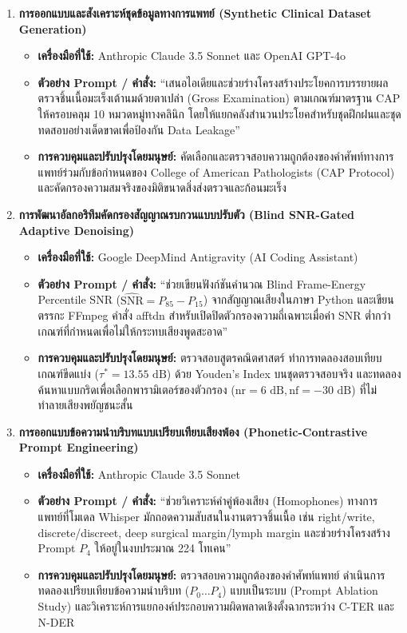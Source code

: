 \begin{enumerate}[label=\textbf{\arabic*.}, leftmargin=*, align=left]

\item \textbf{การออกแบบและสังเคราะห์ชุดข้อมูลทางการแพทย์ (Synthetic Clinical Dataset Generation)}
\begin{itemize}[leftmargin=1.5em]
    \item \textbf{เครื่องมือที่ใช้:} Anthropic Claude 3.5 Sonnet และ OpenAI GPT-4o
    \item \textbf{ตัวอย่าง Prompt / คำสั่ง:} ``เสนอไอเดียและช่วยร่างโครงสร้างประโยคการบรรยายผลตรวจชิ้นเนื้อมะเร็งเต้านมด้วยตาเปล่า (Gross Examination) ตามเกณฑ์มาตรฐาน CAP ให้ครอบคลุม 10 หมวดหมู่ทางคลินิก โดยให้แยกคลังสำนวนประโยคสำหรับชุดฝึกฝนและชุดทดสอบอย่างเด็ดขาดเพื่อป้องกัน Data Leakage''
    \item \textbf{การควบคุมและปรับปรุงโดยมนุษย์:} คัดเลือกและตรวจสอบความถูกต้องของคำศัพท์ทางการแพทย์ร่วมกับข้อกำหนดของ College of American Pathologists (CAP Protocol) และคัดกรองความสมจริงของมิติขนาดสิ่งส่งตรวจและก้อนมะเร็ง
\end{itemize}

\item \textbf{การพัฒนาอัลกอริทึมคัดกรองสัญญาณรบกวนแบบปรับตัว (Blind SNR-Gated Adaptive Denoising)}
\begin{itemize}[leftmargin=1.5em]
    \item \textbf{เครื่องมือที่ใช้:} Google DeepMind Antigravity (AI Coding Assistant)
    \item \textbf{ตัวอย่าง Prompt / คำสั่ง:} ``ช่วยเขียนฟังก์ชันคำนวณ Blind Frame-Energy Percentile SNR ($\widehat{\mathrm{SNR}} = P_{85} - P_{15}$) จากสัญญาณเสียงในภาษา Python และเขียนตรรกะ FFmpeg คำสั่ง afftdn สำหรับเปิดปิดตัวกรองความถี่เฉพาะเมื่อค่า SNR ต่ำกว่าเกณฑ์ที่กำหนดเพื่อไม่ให้กระทบเสียงพูดสะอาด''
    \item \textbf{การควบคุมและปรับปรุงโดยมนุษย์:} ตรวจสอบสูตรคณิตศาสตร์ ทำการทดลองสอบเทียบเกณฑ์ขีดแบ่ง ($\tau^* = 13.55\text{ dB}$) ด้วย Youden's Index บนชุดตรวจสอบจริง และทดลองค้นหาแบบกริดเพื่อเลือกพารามิเตอร์ของตัวกรอง ($\mathrm{nr} = 6\text{ dB}, \mathrm{nf} = -30\text{ dB}$) ที่ไม่ทำลายเสียงพยัญชนะสั้น
\end{itemize}

\item \textbf{การออกแบบข้อความนำบริบทแบบเปรียบเทียบเสียงพ้อง (Phonetic-Contrastive Prompt Engineering)}
\begin{itemize}[leftmargin=1.5em]
    \item \textbf{เครื่องมือที่ใช้:} Anthropic Claude 3.5 Sonnet
    \item \textbf{ตัวอย่าง Prompt / คำสั่ง:} ``ช่วยวิเคราะห์คำคู่พ้องเสียง (Homophones) ทางการแพทย์ที่โมเดล Whisper มักถอดความสับสนในงานตรวจชิ้นเนื้อ เช่น right/write, discrete/discreet, deep surgical margin/lymph margin และช่วยร่างโครงสร้าง Prompt $P_4$ ให้อยู่ในงบประมาณ 224 โทเคน''
    \item \textbf{การควบคุมและปรับปรุงโดยมนุษย์:} ตรวจสอบความถูกต้องของคำศัพท์แพทย์ ดำเนินการทดลองเปรียบเทียบข้อความนำบริบท ($P_0 \dots P_4$) แบบเป็นระบบ (Prompt Ablation Study) และวิเคราะห์การแยกองค์ประกอบความผิดพลาดเชิงตั้งฉากระหว่าง C-TER และ N-DER
\end{itemize}


\end{enumerate}
